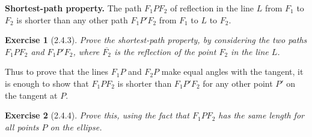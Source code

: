 \documentclass[12pt]{article}
\theoremstyle{plain}
\newtheorem{ex}{Exercise}
\begin{document}
\textbf{Shortest-path property.} The path $F_1PF_2$ of reflection in the line $L$ from $F_1$ to $F_2$ is shorter than any other path $F_1P'F_2$ from $F_1$ to $L$ to $F_2$.

\begin{ex} [2.4.3]
  Prove the shortest-path property, by considering the two paths $F_1PF_2$ and $F_1P'F_2$, where $\overline{F_2}$ is the reflection of the point $F_2$ in the line $L$.
\end{ex}

Thus to prove that the lines $F_1P$ and $F_2P$ make equal angles with the tangent, it is enough to show that $F_1PF_2$ is shorter than $F_1P'F_2$ for any other point $P'$ on the tangent at $P$.

\begin{ex} [2.4.4]
  Prove this, using the fact that $F_1PF_2$ has the same length for all points $P$ on the ellipse.
\end{ex}
\end{document}
